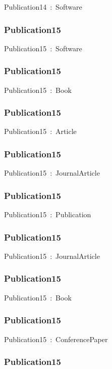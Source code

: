 \documentclass{article}
\begin{document}
Publication14~:~Software

\subsubsection*{Publication15}

Publication15~:~Software

\subsubsection*{Publication15}

Publication15~:~Book

\subsubsection*{Publication15}

Publication15~:~Article

\subsubsection*{Publication15}

Publication15~:~JournalArticle

\subsubsection*{Publication15}

Publication15~:~Publication

\subsubsection*{Publication15}

Publication15~:~JournalArticle

\subsubsection*{Publication15}

Publication15~:~Book

\subsubsection*{Publication15}

Publication15~:~ConferencePaper

\subsubsection*{Publication15}
\end{document}
